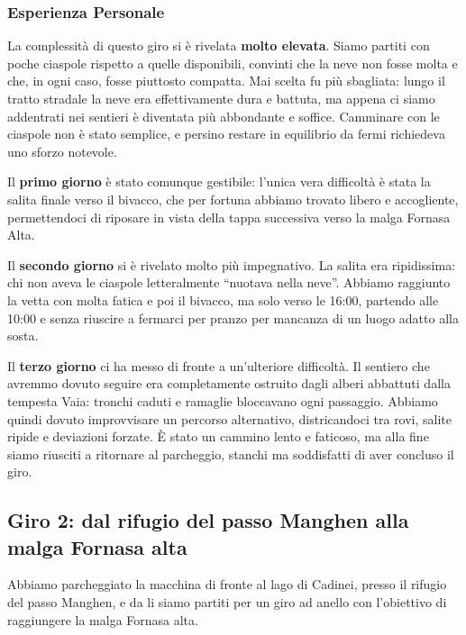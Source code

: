 \documentclass{article}
\begin{document}
\subsubsection{Esperienza Personale}
La complessità di questo giro si è rivelata \textbf{molto elevata}.
Siamo partiti con poche ciaspole rispetto a quelle disponibili, convinti che la neve non fosse molta e che, in ogni caso, fosse piuttosto compatta. Mai scelta fu più sbagliata: lungo il tratto stradale la neve era effettivamente dura e battuta, ma appena ci siamo addentrati nei sentieri è diventata più abbondante e soffice.
Camminare con le ciaspole non è stato semplice, e persino restare in equilibrio da fermi richiedeva uno sforzo notevole. 

Il \textbf{primo giorno} è stato comunque gestibile: l’unica vera difficoltà è stata la salita finale verso il bivacco, che per fortuna abbiamo trovato libero e accogliente, permettendoci di riposare in vista della tappa successiva verso la malga Fornasa Alta.

Il \textbf{secondo giorno} si è rivelato molto più impegnativo. La salita era ripidissima: chi non aveva le ciaspole letteralmente “nuotava nella neve”. Abbiamo raggiunto la vetta con molta fatica e poi il bivacco, ma solo verso le 16:00, partendo alle 10:00 e senza riuscire a fermarci per pranzo per mancanza di un luogo adatto alla sosta.

Il \textbf{terzo giorno} ci ha messo di fronte a un’ulteriore difficoltà. Il sentiero che avremmo dovuto seguire era completamente ostruito dagli alberi abbattuti dalla tempesta Vaia: tronchi caduti e ramaglie bloccavano ogni passaggio. Abbiamo quindi dovuto improvvisare un percorso alternativo, districandoci tra rovi, salite ripide e deviazioni forzate. È stato un cammino lento e faticoso, ma alla fine siamo riusciti a ritornare al parcheggio, stanchi ma soddisfatti di aver concluso il giro.


\subsection{Giro 2: dal rifugio del passo Manghen alla malga Fornasa alta}
Abbiamo parcheggiato la macchina di fronte al lago di Cadinei, presso il rifugio del passo Manghen, e da li siamo partiti per un giro ad anello con l'obiettivo di raggiungere la malga Fornasa alta.
\end{document}
